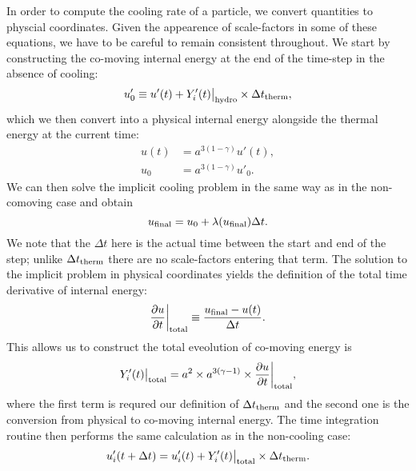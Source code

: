 \documentclass[fleqn, usenatbib, useAMS, a4paper]{mnras}
\begin{document}
In order to compute the
cooling rate of a particle, we convert quantities to physcial
coordinates. Given the appearence of scale-factors in some of these
equations, we have to be careful to remain consistent throughout. We
start by constructing the co-moving internal energy at the end of the
time-step in the absence of cooling:
\begin{equation}
  u'_0 \equiv u'(t) + Y'_i(t)\big|_{\rm hydro} \times \Delta t_{\rm therm},
\end{equation}
which we then convert into a physical internal energy alongside the
thermal energy at the current time:
\begin{align}
  u(t) &= a^{3(1-\gamma)}u'(t),\\
  u_0 &= a^{3(1-\gamma)}u'_0.
\end{align}
We can then solve the implicit cooling problem in the same way as in
the non-comoving case and obtain
\begin{equation}
  u_{\rm final} = u_0 + \lambda(u_{\rm final}) \Delta t.
\end{equation}
We note that the $\Delta t$ here is the actual time between the start
and end of the step; unlike $\Delta t_{\rm therm}$ there are no
scale-factors entering that term. The solution to the implicit problem
in physical coordinates yields the definition of the total time
derivative of internal energy:
\begin{equation}
  \frac{\partial u}{\partial t}\bigg|_{\rm total} \equiv \frac{u_{\rm final} -
    u(t)}{\Delta t}.
\end{equation}
This allows us to construct the total eveolution of co-moving energy
is
\begin{equation}
  Y'_i(t)\big|_{\rm total} = a^2\times a^{3(\gamma-1)} \times
  \frac{\partial u}{\partial t}\bigg|_{\rm total},
\end{equation}
where the first term is requred our definition of $\Delta t_{\rm
  therm}$ and the second one is the conversion from physical to
co-moving internal energy. The time integration routine then performs
the same calculation as in the non-cooling case:
\begin{equation}
  u'_i(t+\Delta t) = u'_i(t) + Y'_i(t)\big|_{\rm total} \times {\Delta t_{\rm therm}}.
\end{equation}
\end{document}
